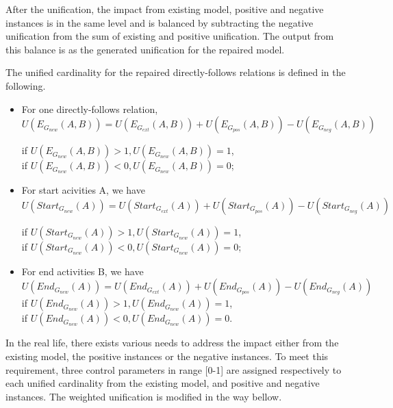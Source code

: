 After the unification, the impact from existing model, positive and negative instances is in the same level and is balanced by subtracting the negative unification from the sum of existing and positive unification. The output from this balance is as the generated unification for the repaired model. 
\begin{definition}
The unified cardinality for the repaired directly-follows relations is defined in the following.
	\begin{itemize}
		\item For one directly-follows relation, \[ U(E_{G_{new}}(A,B)) =  U(E_{G_{ext}}(A,B))+ U(E_{G_{pos}}(A,B))  - U(E_{G_{neg}}(A,B)) \] 
		
		if $U(E_{G_{new}}(A,B)) > 1 , U(E_{G_{new}}(A,B)) =1$, \\
		if $U(E_{G_{new}}(A,B)) < 0 , U(E_{G_{new}}(A,B)) =0$; 
	    
		\item For start acivities A, we have 
		\[ U(Start_{G_{new}}(A)) =  U(Start_{G_{ext}}(A)) + U(Start_{G_{pos}}(A)) - U(Start_{G_{neg}}(A)) \]
		
		if $U(Start_{G_{new}}(A)) > 1 , U(Start_{G_{new}}(A)) =1$, \\
		if $U(Start_{G_{new}}(A)) < 0 , U(Start_{G_{new}}(A)) =0$;  
		
		\item For end activities B, we have
		\[ U(End_{G_{new}}(A)) = U(End_{G_{ext}}(A)) +  U(End_{G_{pos}}(A)) - U(End_{G_{neg}}(A)) \]
		if $U(End_{G_{new}}(A)) > 1 , U(End_{G_{new}}(A)) =1$, \\
		if $U(End_{G_{new}}(A)) < 0 , U(End_{G_{new}}(A)) =0$. 
	\end{itemize}
\end{definition} 
In the real life, there exists various needs to address the impact either from the existing model, the positive instances or the negative instances. To meet this requirement, three control parameters in range [0-1] are assigned respectively to each unified cardinality from the existing model, and positive and negative instances. The weighted unification is modified in the way bellow. 

